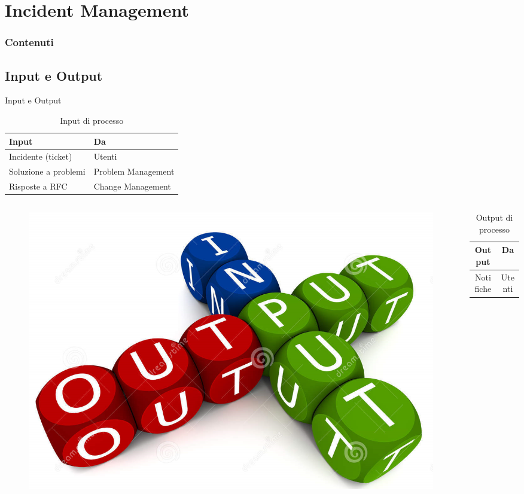%
\section{Incident Management}
\frame
{
\frametitle{Contenuti}
\tableofcontents[currentsection]
}

\subsection*{Input e Output}
\begin{frame}{Input e Output}
\begin{table}
\begin{tabular}{ l | l }
\textbf{Input} & \textbf{Da}\\
\hline
Incidente (ticket) & Utenti\\
Soluzione a problemi & Problem Management\\
Risposte a RFC & Change Management\\
\end{tabular}
\caption{Input di processo}
\end{table}
\begin{columns}
\begin{column}{0.3\textwidth}
\begin{figure}
\includegraphics[scale=0.1]{Images/Input_output.png}
\end{figure}
\end{column}
\begin{column}{0.7\textwidth}
\begin{table}
\begin{tabular}{ c | c }
\textbf{Output} & \textbf{Da}\\
\hline
Notifiche & Utenti\\
\end{tabular}
\caption{Output di processo}
\end{table}
\end{column}
\end{columns}
\end{frame}

